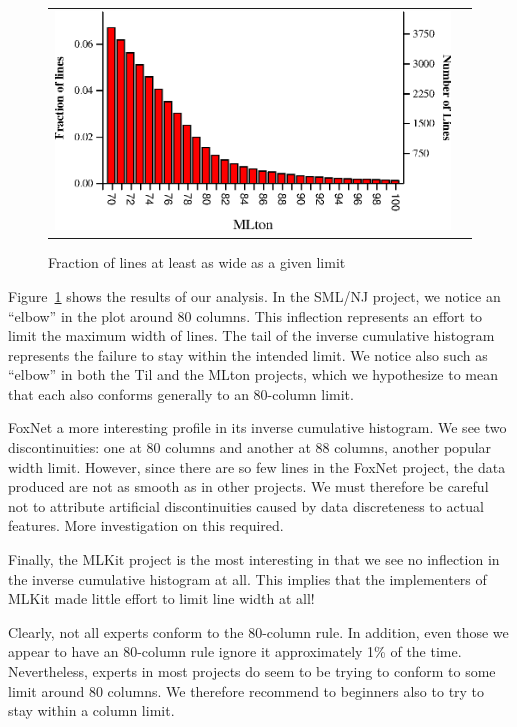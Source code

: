 \documentclass[12pt,abstracton]{scrartcl}
\begin{document}
\begin{figure}[h!]
\begin{tabular}{cc}
\includegraphics[scale=0.72]{mlton.eps} &
\end{tabular}
\caption{Fraction of lines at least as wide as a given limit}
\label{fig:width}
\end{figure}

Figure~\ref{fig:width} shows the results of our analysis. In the SML/NJ project,
we notice an ``elbow'' in the plot around 80 columns. This inflection represents
an effort to limit the maximum width of lines. The tail of the inverse cumulative
histogram represents the failure to stay within the intended limit. We notice
also such as ``elbow'' in both the Til and the MLton projects, which we hypothesize
to mean that each also conforms generally to an 80-column limit.

FoxNet a more interesting profile in its inverse cumulative histogram. We see
two discontinuities: one at 80 columns and another at 88 columns, another popular width limit.
However, since there are so few lines in the FoxNet project, the data produced are
not as smooth as in other projects. We must therefore be careful not to attribute
artificial discontinuities caused by data discreteness to actual features. More
investigation on this required.

Finally, the MLKit project is the most interesting in that we see no inflection in the
inverse cumulative histogram at all. This implies that the implementers of MLKit made little
effort to limit line width at all!

Clearly, not all experts conform to the 80-column rule.
In addition, even those we appear to have an 80-column rule ignore it approximately 1\% of the time.
Nevertheless, experts in most projects do seem to be trying to conform to some limit around 80 columns.
We therefore recommend to beginners also to try to stay within a column limit.
\end{document}
